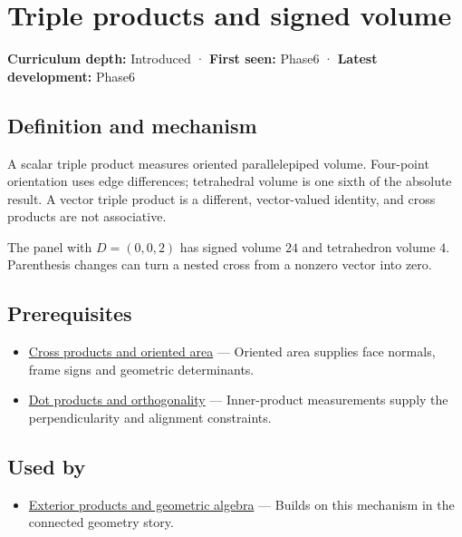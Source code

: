 \hypertarget{appendix-5caa058bd9c7}{}\label{referencestart:appendix-5caa058bd9c7}
\section{Triple products and signed volume}\label{appendix-5caa058bd9c7-triple-products-and-signed-volume}

\textbf{Curriculum depth:} Introduced · \textbf{First seen:} Phase6 · \textbf{Latest development:} Phase6

\subsection{Definition and mechanism}\label{appendix-5caa058bd9c7-definition-and-mechanism}

A scalar triple product measures oriented parallelepiped volume. Four-point orientation uses edge differences; tetrahedral volume is one sixth of the absolute result. A vector triple product is a different, vector-valued identity, and cross products are not associative.

The panel with \(D=(0,0,2)\) has signed volume \(24\) and tetrahedron volume \(4\). Parenthesis changes can turn a nested cross from a nonzero vector into zero.

\subsection{Prerequisites}\label{appendix-5caa058bd9c7-prerequisites}

\begin{itemize}
\tightlist
\item
  \hyperref[appendix-2391db8052b1]{Cross products and oriented area} --- Oriented area supplies face normals, frame signs and geometric determinants.
\item
  \hyperref[appendix-8bc4e8fc547c]{Dot products and orthogonality} --- Inner-product measurements supply the perpendicularity and alignment constraints.
\end{itemize}

\subsection{Used by}\label{appendix-5caa058bd9c7-used-by}

\begin{itemize}
\tightlist
\item
  \hyperref[appendix-e1960925d1b8]{Exterior products and geometric algebra} --- Builds on this mechanism in the connected geometry story.
\end{itemize}

